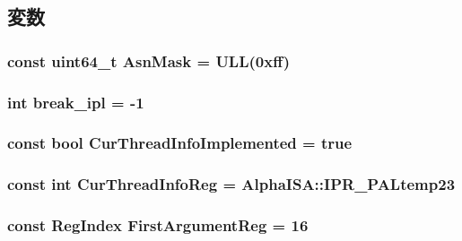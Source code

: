 \subsection{変数}
\hypertarget{namespaceAlphaISA_ab71cf3e85f86b7f2ed5572f2c4c04129}{
\subsubsection[{AsnMask}]{\setlength{\rightskip}{0pt plus 5cm}const uint64\_\-t {\bf AsnMask} = ULL(0xff)}}
\label{namespaceAlphaISA_ab71cf3e85f86b7f2ed5572f2c4c04129}
\hypertarget{namespaceAlphaISA_a21fbc55471b0f0ca756a8ff20c86926a}{
\subsubsection[{break\_\-ipl}]{\setlength{\rightskip}{0pt plus 5cm}int {\bf break\_\-ipl} = -\/1}}
\label{namespaceAlphaISA_a21fbc55471b0f0ca756a8ff20c86926a}
\hypertarget{namespaceAlphaISA_a9faf3aac879cfa867d4ae15d4119c45e}{
\subsubsection[{CurThreadInfoImplemented}]{\setlength{\rightskip}{0pt plus 5cm}const bool {\bf CurThreadInfoImplemented} = true}}
\label{namespaceAlphaISA_a9faf3aac879cfa867d4ae15d4119c45e}
\hypertarget{namespaceAlphaISA_a7e5bf2f33f34327efc1eeccbb0c1141f}{
\subsubsection[{CurThreadInfoReg}]{\setlength{\rightskip}{0pt plus 5cm}const int {\bf CurThreadInfoReg} = AlphaISA::IPR\_\-PALtemp23}}
\label{namespaceAlphaISA_a7e5bf2f33f34327efc1eeccbb0c1141f}
\hypertarget{namespaceAlphaISA_a4ea7a0e850916ddcb5d2b77078e3e0c7}{
\subsubsection[{FirstArgumentReg}]{\setlength{\rightskip}{0pt plus 5cm}const {\bf RegIndex} {\bf FirstArgumentReg} = 16}}
